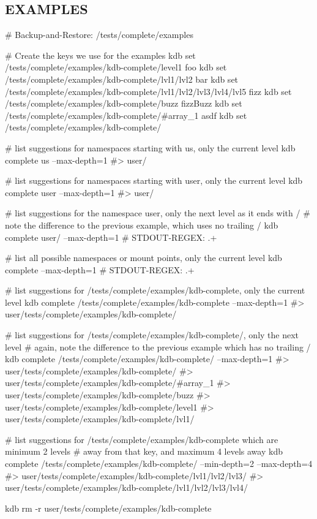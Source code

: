 \subsection*{E\+X\+A\+M\+P\+L\+ES}


\begin{DoxyCode}
# Backup-and-Restore: /tests/complete/examples

# Create the keys we use for the examples
kdb set /tests/complete/examples/kdb-complete/level1 foo
kdb set /tests/complete/examples/kdb-complete/lvl1/lvl2 bar
kdb set /tests/complete/examples/kdb-complete/lvl1/lvl2/lvl3/lvl4/lvl5 fizz
kdb set /tests/complete/examples/kdb-complete/buzz fizzBuzz
kdb set /tests/complete/examples/kdb-complete/#array\_1 asdf
kdb set /tests/complete/examples/kdb-complete/%

# list suggestions for namespaces starting with us, only the current level
kdb complete us --max-depth=1
#> user/

# list suggestions for namespaces starting with user, only the current level
kdb complete user --max-depth=1
#> user/

# list suggestions for the namespace user, only the next level as it ends with /
# note the difference to the previous example, which uses no trailing /
kdb complete user/ --max-depth=1
# STDOUT-REGEX: .+

# list all possible namespaces or mount points, only the current level
kdb complete --max-depth=1
# STDOUT-REGEX: .+

# list suggestions for /tests/complete/examples/kdb-complete, only the current level
kdb complete /tests/complete/examples/kdb-complete --max-depth=1
#> user/tests/complete/examples/kdb-complete/

# list suggestions for /tests/complete/examples/kdb-complete/, only the next level
# again, note the difference to the previous example which has no trailing /
kdb complete /tests/complete/examples/kdb-complete/ --max-depth=1
#> user/tests/complete/examples/kdb-complete/%
#> user/tests/complete/examples/kdb-complete/#array\_1
#> user/tests/complete/examples/kdb-complete/buzz
#> user/tests/complete/examples/kdb-complete/level1
#> user/tests/complete/examples/kdb-complete/lvl1/

# list suggestions for /tests/complete/examples/kdb-complete which are minimum 2 levels
# away from that key, and maximum 4 levels away
kdb complete /tests/complete/examples/kdb-complete/ --min-depth=2 --max-depth=4
#> user/tests/complete/examples/kdb-complete/lvl1/lvl2/lvl3/
#> user/tests/complete/examples/kdb-complete/lvl1/lvl2/lvl3/lvl4/

kdb rm -r user/tests/complete/examples/kdb-complete
\end{DoxyCode}


